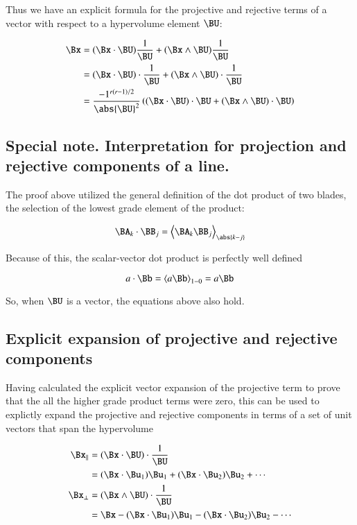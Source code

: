 \documentclass{article}
\begin{document}
Thus we have an explicit formula for the projective and rejective terms of a vector with respect to a hypervolume element $\BU$:

\begin{align*}
\Bx
&= (\Bx \cdot \BU)\frac{1}{\BU} + (\Bx \wedge \BU)\frac{1}{\BU} \\
&= (\Bx \cdot \BU) \cdot \frac{1}{\BU} + (\Bx \wedge \BU) \cdot \frac{1}{\BU} \\
&= \frac{-1^{r(r-1)/2}}{\abs{\BU}^2}
\left( (\Bx \cdot \BU) \cdot {\BU} + (\Bx \wedge \BU) \cdot {\BU} \right) \\
\end{align*}

\subsection{ Special note.  Interpretation for projection and rejective components of a line. }

The proof above utilized the general definition of the dot product of two blades, the selection of the lowest grade element of the product:

\[
\BA_k \cdot \BB_j = \left<\BA_k \BB_j\right>_{\abs{k-j}}
\]

Because of this, the scalar-vector dot product is perfectly well defined

\[
a \cdot \Bb = \left<a \Bb\right>_{1-0} = a \Bb
\]

So, when $\BU$ is a vector, the equations above also hold.

\subsection{ Explicit expansion of projective and rejective components }

Having calculated the explicit vector expansion of the projective term to prove that the all the higher grade
product terms were zero, this can be used to explictly expand the projective and rejective components
in terms of a set of unit vectors that span the hypervolume

\begin{align*}
\Bx_\parallel 
&= (\Bx \cdot \BU) \cdot \frac{1}{\BU} \\
&= 
  (\Bx \cdot \Bu_1)\Bu_1
+ (\Bx \cdot \Bu_2)\Bu_2
+ \cdots \\
\Bx_\perp
&= (\Bx \wedge \BU) \cdot \frac{1}{\BU} \\
&= \Bx
- (\Bx \cdot \Bu_1)\Bu_1
- (\Bx \cdot \Bu_2)\Bu_2
- \cdots \\
\end{align*}
\end{document}

